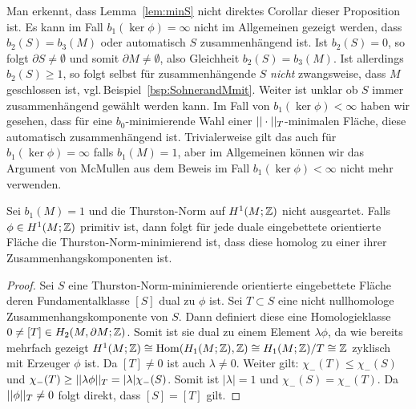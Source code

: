 \begin{bem}
    Man erkennt, dass Lemma~\ref{lem:minS} nicht direktes Corollar dieser Proposition ist. Es kann im Fall $b_1(\ker\phi)=\infty$ nicht im Allgemeinen gezeigt werden, dass $b_2(S)=b_3(M)$ oder automatisch $S$ zusammenhängend ist. Ist $b_2(S)=0$, so folgt $\partial S \neq \emptyset$ und somit $\partial M \neq \emptyset$, also Gleichheit $b_2(S)=b_3(M)$. Ist allerdings $b_2(S)\geq 1$, so folgt selbst für zusammenhängende $S$ \emph{nicht} zwangsweise, dass $M$ geschlossen ist, vgl.\,Beispiel~\ref{bsp:SohnerandMmit}. Weiter ist unklar ob $S$ immer zusammenhängend gewählt werden kann. Im Fall von $b_1(\ker\phi)<\infty$ haben wir gesehen, dass für eine $b_0$-minimierende Wahl einer $||\cdot||_T$-minimalen Fläche, diese automatisch zusammenhängend ist. Trivialerweise gilt das auch für $b_1(\ker\phi)=\infty$ falls $b_1(M)=1$, aber im Allgemeinen können wir das Argument von McMullen aus dem Beweis im Fall $b_1(\ker\phi)<\infty$ nicht mehr verwenden.
\end{bem}
\begin{lem}
    Sei $b_1(M)=1$ und die Thurston-Norm auf $H^1(M;\mathbb{Z})$ nicht ausgeartet. Falls $\phi \in H^1(M;\mathbb{Z})$ primitiv ist, dann folgt für jede duale eingebettete orientierte Fläche die Thurston-Norm-minimierend ist, dass diese homolog zu einer ihrer Zusammenhangskomponenten ist.
\end{lem}
\begin{proof}
    Sei $S$ eine Thurston-Norm-minimierende orientierte eingebettete Fläche deren Fundamentalklasse $[S]$ dual zu $\phi$ ist. Sei $T \subset S$ eine nicht nullhomologe Zusammenhangskomponente von $S$. Dann definiert diese eine Homologieklasse $0 \neq [T] \in H_2(M,\partial M;\mathbb{Z})$. Somit ist sie dual zu einem Element $\lambda \phi$, da wie bereits mehrfach gezeigt $H^1(M;\mathbb{Z})\cong \operatorname{Hom}(H_1(M;\mathbb{Z}),\mathbb{Z}) \cong H_1(M;\mathbb{Z})/T \cong \mathbb{Z}$ zyklisch mit Erzeuger $\phi$ ist. Da $[T]\neq 0$ ist auch $\lambda \neq 0$. Weiter gilt: $\chi_-(T) \leq \chi_-(S)$ und $\chi_-(T)\geq ||\lambda\phi||_T = |\lambda| \chi_-(S)$. Somit ist $|\lambda|=1$ und $\chi_-(S)=\chi_-(T)$. Da $||\phi||_T \neq 0$ folgt direkt, dass $[S]=[T]$ gilt. 
\end{proof}
